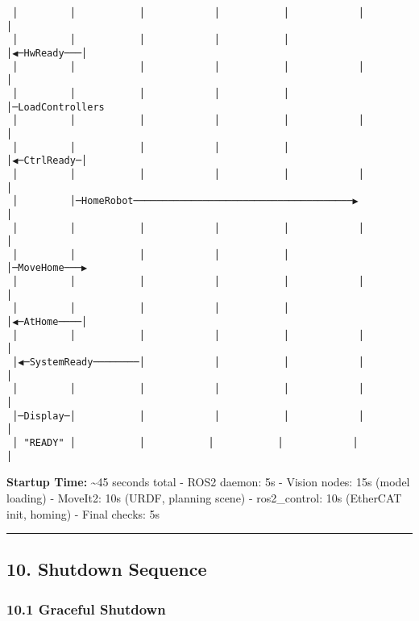 \documentclass[
]{article}
\begin{document}
\begin{verbatim}
 │         │           │            │           │            │            │
 │         │           │            │           │            │◀─HwReady───│
 │         │           │            │           │            │            │
 │         │           │            │           │            │─LoadControllers
 │         │           │            │           │            │            │
 │         │           │            │           │            │◀─CtrlReady─│
 │         │           │            │           │            │            │
 │         │─HomeRobot──────────────────────────────────────▶            │
 │         │           │            │           │            │            │
 │         │           │            │           │            │─MoveHome───▶
 │         │           │            │           │            │            │
 │         │           │            │           │            │◀─AtHome────│
 │         │           │            │           │            │            │
 │◀─SystemReady────────│            │           │            │            │
 │         │           │            │           │            │            │
 │─Display─│           │            │           │            │            │
 │ "READY" │           │           │           │            │            │
\end{verbatim}

\textbf{Startup Time:} \textasciitilde45 seconds total - ROS2 daemon: 5s
- Vision nodes: 15s (model loading) - MoveIt2: 10s (URDF, planning
scene) - ros2\_control: 10s (EtherCAT init, homing) - Final checks: 5s

\begin{center}\rule{0.5\linewidth}{0.5pt}\end{center}

\hypertarget{shutdown-sequence}{%
\subsection{10. Shutdown Sequence}\label{shutdown-sequence}}

\hypertarget{graceful-shutdown}{%
\subsubsection{10.1 Graceful Shutdown}\label{graceful-shutdown}}
\end{document}
